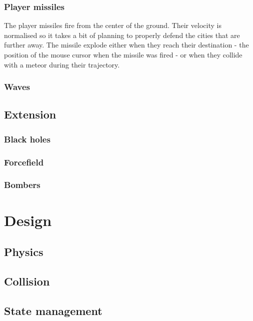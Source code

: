 \documentclass{article}
\begin{document}
\subsubsection*{Player missiles}
The player missiles fire from the center of the ground. Their velocity is normalised so it takes a bit of planning to properly defend the cities that are further away. The missile explode either when they reach their destination - the position of the mouse cursor when the missile was fired - or when they collide with a meteor during their trajectory. 


\subsubsection*{Waves}



\subsection{Extension}

\subsubsection*{Black holes}

\subsubsection*{Forcefield}

\subsubsection*{Bombers}



\section{Design}


\subsection{Physics}


\subsection{Collision}
 

\subsection{State management}
\end{document}
